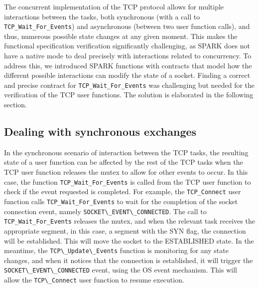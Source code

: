 \documentclass[conference]{IEEEtran}
\def\spark#1{\lstinline[language=Ada]{#1}}
\def\state#1{\textsf{\MakeUppercase{#1}}\xspace}
\def\sestab{\state{established}}
\def\flag#1{\textsf{#1}\xspace}
\def\syn{\flag{SYN}}
\begin{document}
The concurrent implementation of the TCP protocol allows for multiple interactions between the tasks, both synchronous (with a call to \spark{TCP_Wait_For_Events}) and asynchronous (between two user function calls), and thus, numerous possible state changes at any given moment. This makes the functional specification verification significantly challenging, as SPARK does not have a native mode to deal precisely with interactions related to concurrency. To address this, we introduced SPARK functions with contracts that model how the different possible interactions can modify the state of a socket. Finding a correct and precise contract for \spark{TCP_Wait_For_Events} was challenging but needed for the verification of the TCP user functions. The solution is elaborated in the following section.


\subsection{Dealing with synchronous exchanges}

In the synchronous scenario of interaction between the TCP tasks, the resulting state of a user function can be affected by the rest of the TCP tasks when the TCP user function releases the mutex to allow for other events to occur. In this case, the function \spark{TCP_Wait_For_Events} is called from the TCP user function to check if the event requested is completed. For example, the \spark{TCP_Connect} user function calls \spark{TCP_Wait_For_Events} to wait for the completion of the socket connection event, namely \spark{SOCKET\_EVENT\_CONNECTED}. The call to \spark{TCP_Wait_For_Events} releases the mutex, and when the relevant task receives the appropriate segment, in this case, a segment with the \syn flag, the connection will be established. This will move the socket to the \sestab state. In the meantime, the \spark{TCP\_Update\_Events} function is monitoring for any state changes, and when it notices that the connection is established, it will trigger the \spark{SOCKET\_EVENT\_CONNECTED} event, using the OS event mechanism. This will allow the \spark{TCP\_Connect} user function to resume execution.



\end{document}
